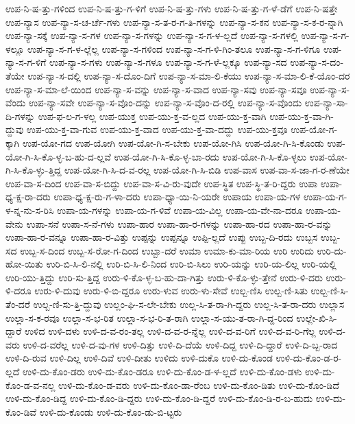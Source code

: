 {ಉಪ-ನಿ-ಷ-ತ್ತು-ಗಳಿಂದ
ಉಪ-ನಿ-ಷ-ತ್ತು-ಗ-ಳಿಗೆ
ಉಪ-ನಿ-ಷ-ತ್ತು-ಗಳು
ಉಪ-ನಿ-ಷ-ತ್ತು-ಗ-ಳೆ-ಡೆಗೆ
ಉಪ-ನಿ-ಷತ್ತೇ
ಉಪ-ನ್ಯಾಸ
ಉಪ-ನ್ಯಾ-ಸ-ಚ-ರ್ಚೆ-ಗಳು
ಉಪ-ನ್ಯಾ-ಸ-ತ-ರ-ಗ-ತಿ-ಗಳನ್ನು
ಉಪ-ನ್ಯಾ-ಸ-ಕನ
ಉಪ-ನ್ಯಾ-ಸ-ಕ-ರ-ನ್ನಾಗಿ
ಉಪ-ನ್ಯಾ-ಸಕ್ಕೆ
ಉಪ-ನ್ಯಾ-ಸ-ಗಳ
ಉಪ-ನ್ಯಾ-ಸ-ಗಳನ್ನು
ಉಪ-ನ್ಯಾ-ಸ-ಗ-ಳ-ಲ್ಲದೆ
ಉಪ-ನ್ಯಾ-ಸ-ಗಳಲ್ಲಿ
ಉಪ-ನ್ಯಾ-ಸ-ಗ-ಳಲ್ಲೂ
ಉಪ-ನ್ಯಾ-ಸ-ಗ-ಳ-ಲ್ಲೆಲ್ಲ
ಉಪ-ನ್ಯಾ-ಸ-ಗಳಿಂದ
ಉಪ-ನ್ಯಾ-ಸ-ಗ-ಳಿ-ಗಿಂ-ತಲೂ
ಉಪ-ನ್ಯಾ-ಸ-ಗ-ಳಿಗೂ
ಉಪ-ನ್ಯಾ-ಸ-ಗ-ಳಿಗೆ
ಉಪ-ನ್ಯಾ-ಸ-ಗಳು
ಉಪ-ನ್ಯಾ-ಸ-ಗಳೂ
ಉಪ-ನ್ಯಾ-ಸ-ಗ-ಳೆ-ಲ್ಲಕ್ಕೂ
ಉಪ-ನ್ಯಾ-ಸದ
ಉಪ-ನ್ಯಾ-ಸ-ದಂ-ತೆಯೇ
ಉಪ-ನ್ಯಾ-ಸ-ದಲ್ಲಿ
ಉಪ-ನ್ಯಾ-ಸ-ದೊಂ-ದಿಗೆ
ಉಪ-ನ್ಯಾ-ಸ-ಮಾ-ಲಿ-ಕೆಯು
ಉಪ-ನ್ಯಾ-ಸ-ಮಾ-ಲಿ-ಕೆ-ಯೊಂ-ದರ
ಉಪ-ನ್ಯಾ-ಸ-ಮಾ-ಲೆ-ಯಿಂದ
ಉಪ-ನ್ಯಾ-ಸ-ವನ್ನು
ಉಪ-ನ್ಯಾ-ಸ-ವಾದ
ಉಪ-ನ್ಯಾ-ಸವು
ಉಪ-ನ್ಯಾ-ಸವೂ
ಉಪ-ನ್ಯಾ-ಸ-ವೆಂದು
ಉಪ-ನ್ಯಾ-ಸವೇ
ಉಪ-ನ್ಯಾ-ಸ-ವೊಂ-ದನ್ನು
ಉಪ-ನ್ಯಾ-ಸ-ವೊಂ-ದ-ರಲ್ಲಿ
ಉಪ-ನ್ಯಾ-ಸ-ವೊಂದು
ಉಪ-ನ್ಯಾ-ಸಾ-ದಿ-ಗಳನ್ನು
ಉಪ-ಫ-ಲ-ಗ-ಳಲ್ಲ
ಉಪ-ಯುಕ್ತ
ಉಪ-ಯು-ಕ್ತ-ವ-ಲ್ಲದ
ಉಪ-ಯು-ಕ್ತ-ವಾಗಿ
ಉಪ-ಯು-ಕ್ತ-ವಾ-ಗಿ-ದ್ದುವು
ಉಪ-ಯು-ಕ್ತ-ವಾ-ಗುವ
ಉಪ-ಯು-ಕ್ತ-ವಾದ
ಉಪ-ಯು-ಕ್ತ-ವಾ-ದದ್ದು
ಉಪ-ಯು-ಕ್ತವೂ
ಉಪ-ಯೋ-ಗ-ಕ್ಕಾಗಿ
ಉಪ-ಯೋ-ಗದ
ಉಪ-ಯೋಗಿ
ಉಪ-ಯೋ-ಗಿ-ಸ-ಬೇಕು
ಉಪ-ಯೋ-ಗಿಸಿ
ಉಪ-ಯೋ-ಗಿ-ಸಿ-ಕೊಂಡು
ಉಪ-ಯೋ-ಗಿ-ಸಿ-ಕೊ-ಳ್ಳ-ಬ-ಹು-ದ-ಲ್ಲವೆ
ಉಪ-ಯೋ-ಗಿ-ಸಿ-ಕೊ-ಳ್ಳ-ಬಾ-ರದು
ಉಪ-ಯೋ-ಗಿ-ಸಿ-ಕೊ-ಳ್ಳಲು
ಉಪ-ಯೋ-ಗಿ-ಸಿ-ಕೊ-ಳ್ಳು-ತ್ತಿದ್ದ
ಉಪ-ಯೋ-ಗಿ-ಸಿ-ದ-ವ-ರಲ್ಲ
ಉಪ-ಯೋ-ಗಿ-ಸಿ-ಬಿಡಿ
ಉಪ-ವಾಸ
ಉಪ-ವಾ-ಸ-ಜಾ-ಗ-ರ-ಣೆಯೇ
ಉಪ-ವಾ-ಸ-ದಿಂದ
ಉಪ-ವಾ-ಸ-ಬಿದ್ದು
ಉಪ-ವಾ-ಸ-ವಿ-ರು-ವುದೇ
ಉಪ-ಸ್ಥಿತ
ಉಪ-ಸ್ಥಿ-ತ-ರಿ-ದ್ದರು
ಉಪಾ
ಉಪಾ-ಧ್ಯ-ಕ್ಷ-ರಾ-ದರು
ಉಪಾ-ಧ್ಯ-ಕ್ಷ-ರು-ಗ-ಳಾ-ದರು
ಉಪಾ-ಧ್ಯಾ-ಯಿ-ನಿ-ಯರೇ
ಉಪಾಯ
ಉಪಾ-ಯ-ಗಳ
ಉಪಾ-ಯ-ಗ-ಳ-ನ್ನ-ನು-ಸ-ರಿಸಿ
ಉಪಾ-ಯ-ಗಳನ್ನು
ಉಪಾ-ಯ-ಗ-ಳಿವೆ
ಉಪಾ-ಯ-ವಿಲ್ಲ
ಉಪಾ-ಯ-ವೇ-ನಾ-ದರೂ
ಉಪಾ-ಯ-ವೇನು
ಉಪಾ-ಸನೆ
ಉಪಾ-ಸ-ನೆ-ಗಳು
ಉಪಾ-ಹಾರ
ಉಪಾ-ಹಾ-ರ-ಗಳನ್ನು
ಉಪಾ-ಹಾ-ರದ
ಉಪಾ-ಹಾ-ರ-ವನ್ನು
ಉಪಾ-ಹಾ-ರ-ವನ್ನೂ
ಉಪಾ-ಹಾ-ರ-ವಿತ್ತು
ಉಪ್ಪನ್ನು
ಉಪ್ಪನ್ನೂ
ಉಪ್ಪಿ-ಲ್ಲದೆ
ಉಪ್ಪು
ಉಬ್ಬ-ದಿ-ರದು
ಉಬ್ಬಸ
ಉಬ್ಬ-ಸದ
ಉಬ್ಬ-ಸ-ದಿಂದ
ಉಬ್ಬ-ಸ-ರೋ-ಗ-ದಿಂದ
ಉಬ್ಬಾ-ದರೆ
ಉಮಾ
ಉಮಾ-ಕು-ಮಾ-ರಿಯ
ಉರಿ
ಉರಿದು
ಉರಿ-ದು-ಹೋ-ಯಿತು
ಉರಿ-ಬಿ-ಸಿ-ಲಿ-ನಲ್ಲಿ
ಉರಿ-ಬಿ-ಸಿ-ಲಿ-ನಿಂದ
ಉರಿ-ಬಿ-ಸಿಲು
ಉರಿ-ಯನ್ನು
ಉರಿ-ಯ-ಲಿಲ್ಲ
ಉರಿ-ಯಲ್ಲಿ
ಉರಿ-ಯು-ತ್ತಿದ್ದು
ಉರಿ-ಸು-ತ್ತಿದ್ದ
ಉರು-ಳಿ-ಕೊ-ಳ್ಳ-ಬ-ಹು-ದಾ-ಗಿತ್ತು
ಉರು-ಳಿ-ಕೊ-ಳ್ಳು-ತ್ತೇನೆ
ಉರು-ಳಿ-ದರು
ಉರು-ಳಿ-ದರೂ
ಉರು-ಳಿ-ದುವು
ಉರು-ಳಿ-ಬಿ-ದ್ದರೂ
ಉರು-ಳುವ
ಉರು-ಳು-ಸೇವೆ
ಉಲ್ಬ-ಣಿಸಿ
ಉಲ್ಬ-ಣಿ-ಸಿತು
ಉಲ್ಬ-ಣಿ-ಸಿ-ತೆಂ-ದರೆ
ಉಲ್ಬ-ಣಿ-ಸು-ತ್ತಿ-ದ್ದುವು
ಉಲ್ಲಂ-ಘಿ-ಸ-ಲೇ-ಬೇಕು
ಉಲ್ಲ-ಸಿ-ತ-ರಾ-ಗಿ-ದ್ದರು
ಉಲ್ಲ-ಸಿ-ತ-ರಾ-ದರು
ಉಲ್ಲಾಸ
ಉಲ್ಲಾ-ಸ-ಕ-ರವೂ
ಉಲ್ಲಾ-ಸ-ಭ-ರಿತ
ಉಲ್ಲಾ-ಸ-ಭ-ರಿ-ತ-ರಾಗಿ
ಉಲ್ಲಾ-ಸ-ಯು-ತ-ರಾ-ಗಿ-ದ್ದ-ರಿಂದ
ಉಲ್ಲೇ-ಖಿ-ಸಿ-ದ್ದಾರೆ
ಉಳಿದ
ಉಳಿ-ದಳು
ಉಳಿ-ದ-ವ-ರಂ-ತಲ್ಲ
ಉಳಿ-ದ-ವ-ರ-ನ್ನೆಲ್ಲ
ಉಳಿ-ದ-ವ-ರಿಗೆ
ಉಳಿ-ದ-ವ-ರಿ-ಗೆಲ್ಲ
ಉಳಿ-ದ-ವರು
ಉಳಿ-ದ-ವರೆಲ್ಲ
ಉಳಿ-ದ-ವು-ಗಳ
ಉಳಿ-ದಿತ್ತು
ಉಳಿ-ದಿ-ದೆಯೆ
ಉಳಿ-ದಿದ್ದ
ಉಳಿ-ದಿ-ದ್ದಾರೆ
ಉಳಿ-ದಿ-ಬ್ಬ-ರಾದ
ಉಳಿ-ದಿ-ರುವ
ಉಳಿ-ದಿಲ್ಲ
ಉಳಿ-ದಿವೆ
ಉಳಿ-ದೀತು
ಉಳಿದು
ಉಳಿ-ದುಕೊ
ಉಳಿ-ದು-ಕೊಂಡ
ಉಳಿ-ದು-ಕೊಂ-ಡ-ರ-ಲ್ಲದೆ
ಉಳಿ-ದು-ಕೊಂ-ಡರು
ಉಳಿ-ದು-ಕೊಂ-ಡರೂ
ಉಳಿ-ದು-ಕೊಂ-ಡ-ಳ-ಲ್ಲದೆ
ಉಳಿ-ದು-ಕೊಂ-ಡಳು
ಉಳಿ-ದು-ಕೊಂ-ಡ-ವ-ನಲ್ಲ
ಉಳಿ-ದು-ಕೊಂ-ಡ-ವರು
ಉಳಿ-ದು-ಕೊಂ-ಡಾ-ರೆಂಬ
ಉಳಿ-ದು-ಕೊಂ-ಡಿತು
ಉಳಿ-ದು-ಕೊಂ-ಡಿದೆ
ಉಳಿ-ದು-ಕೊಂ-ಡಿದ್ದ
ಉಳಿ-ದು-ಕೊಂ-ಡಿ-ದ್ದರು
ಉಳಿ-ದು-ಕೊಂ-ಡಿ-ದ್ದರೆ
ಉಳಿ-ದು-ಕೊಂ-ಡಿ-ರ-ಬ-ಹುದು
ಉಳಿ-ದು-ಕೊಂ-ಡಿವೆ
ಉಳಿ-ದು-ಕೊಂಡು
ಉಳಿ-ದು-ಕೊಂ-ಡು-ಬಿ-ಟ್ಟರು
}
